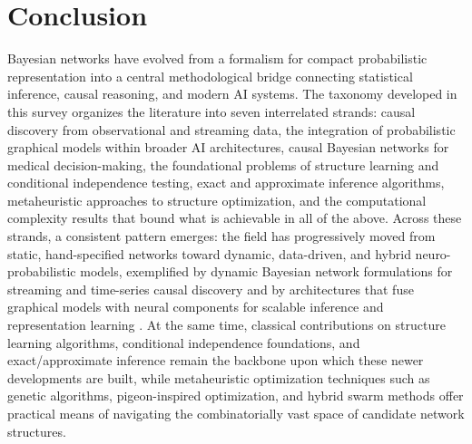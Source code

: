 \section{Conclusion}\label{sec:conclusion}
Bayesian networks have evolved from a formalism for compact probabilistic representation into a central methodological bridge connecting statistical inference, causal reasoning, and modern AI systems. The taxonomy developed in this survey organizes the literature into seven interrelated strands: causal discovery from observational and streaming data, the integration of probabilistic graphical models within broader AI architectures, causal Bayesian networks for medical decision-making, the foundational problems of structure learning and conditional independence testing, exact and approximate inference algorithms, metaheuristic approaches to structure optimization, and the computational complexity results that bound what is achievable in all of the above. Across these strands, a consistent pattern emerges: the field has progressively moved from static, hand-specified networks toward dynamic, data-driven, and hybrid neuro-probabilistic models, exemplified by dynamic Bayesian network formulations for streaming and time-series causal discovery \cite{zhang2026causal,zhang2026causalb,zhang2026causalc,zhang2026dynamic} and by architectures that fuse graphical models with neural components for scalable inference and representation learning \cite{j2016composing,mnih2014neural,polson2023generative}. At the same time, classical contributions on structure learning algorithms, conditional independence foundations, and exact/approximate inference \cite{kitson2023survey,kuipers2021efficient,tsamardinos2006max,murphy2013loopy,darwiche2013conditioning,minka2013expectation,zhang1996exploiting} remain the backbone upon which these newer developments are built, while metaheuristic optimization techniques such as genetic algorithms, pigeon-inspired optimization, and hybrid swarm methods \cite{kareem2019pigeon,sun2022bayesian,sun2019hybrid,liu2022bayesian,sun2025bayesian} offer practical means of navigating the combinatorially vast space of candidate network structures.


